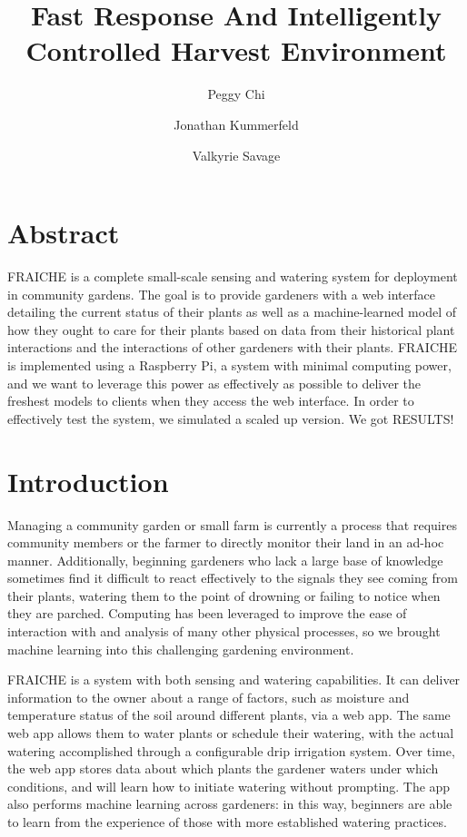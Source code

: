 \documentclass[a4paper]{acm_proc_article-sp}
\begin{document}
\title{Fast Response And Intelligently Controlled Harvest Environment}
\author{Peggy Chi \and Jonathan Kummerfeld \and Valkyrie Savage}
\maketitle

\setcounter{page}{1}

\section{Abstract}

FRAICHE is a complete small-scale sensing and watering system for deployment in community gardens.  The goal is to provide gardeners with a web interface detailing the current status of their plants as well as a machine-learned model of how they ought to care for their plants based on data from their historical plant interactions and the interactions of other gardeners with their plants.  FRAICHE is implemented using a Raspberry Pi, a system with minimal computing power, and we want to leverage this power as effectively as possible to deliver the freshest models to clients when they access the web interface.  In order to effectively test the system, we simulated a scaled up version.  We got RESULTS!

\section{Introduction}

Managing a community garden or small farm is currently a process that requires community members or the farmer to directly monitor their land in an ad-hoc manner.  Additionally, beginning gardeners who lack a large base of knowledge sometimes find it difficult to react effectively to the signals they see coming from their plants, watering them to the point of drowning or failing to notice when they are parched.  Computing has been leveraged to improve the ease of interaction with and analysis of many other physical processes, so we brought machine learning into this challenging gardening environment.

FRAICHE is a system with both sensing and watering capabilities. It can deliver information to the owner about a range of factors, such as moisture and temperature status of the soil around different plants, via a web app.  The same web app allows them to water plants or schedule their watering, with the actual watering accomplished through a configurable drip irrigation system.  Over time, the web app stores data about which plants the gardener waters under which conditions, and will learn how to initiate watering without prompting.  The app also performs machine learning across gardeners: in this way, beginners are able to learn from the experience of those with more established watering practices.
\end{document}
